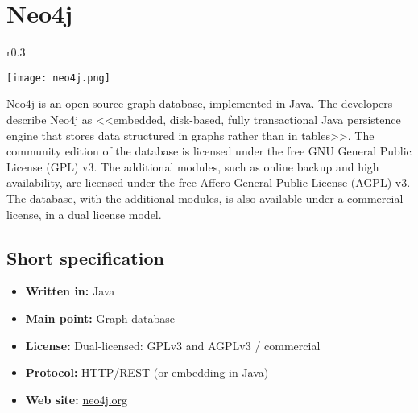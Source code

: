 \chapter{Neo4j}

\begin{wrapfigure}{r}{0.3\textwidth}
  \vspace{-42pt}
  \begin{center}
    \texttt{[image: neo4j.png]}
  \end{center}
  \vspace{-20pt}
\end{wrapfigure}
Neo4j is an open-source graph database, implemented in Java. The developers describe Neo4j as <<embedded, disk-based, fully transactional Java persistence engine that stores data structured in graphs rather than in tables>>. The community edition of the database is licensed under the free GNU General Public License (GPL) v3. The additional modules, such as online backup and high availability, are licensed under the free Affero General Public License (AGPL) v3. The database, with the additional modules, is also available under a commercial license, in a dual license model.

\section{Short specification}

\begin{itemize}
  \item \textbf{Written in:} Java
  \item \textbf{Main point:} Graph database
  \item \textbf{License:} Dual-licensed: GPLv3 and AGPLv3 / commercial
  \item \textbf{Protocol:} HTTP/REST (or embedding in Java)
  \item \textbf{Web site:} \href{http://neo4j.org/}{neo4j.org}
\end{itemize}